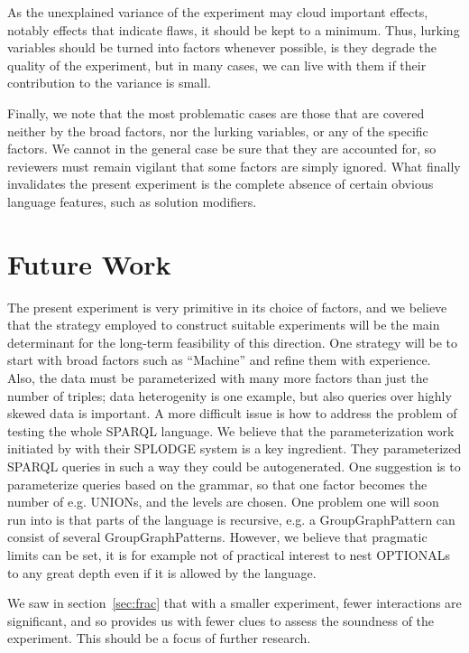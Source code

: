 \documentclass{llncs}
\begin{document}
As the unexplained variance of the experiment may cloud important
effects, notably effects that indicate flaws, it should be kept to a
minimum. Thus, lurking variables should be turned into factors
whenever possible, is they degrade the quality of the experiment, but
in many cases, we can live with them if their contribution to the
variance is small.

Finally, we note that the most problematic cases are those that are
covered neither by the broad factors, nor the lurking variables, or
any of the specific factors. We cannot in the general case be sure
that they are accounted for, so reviewers must remain vigilant that
some factors are simply ignored. What finally invalidates the present
experiment is the complete absence of certain obvious language
features, such as solution modifiers.

\section{Future Work}

The present experiment is very primitive in its choice of factors, and
we believe that the strategy employed to construct suitable
experiments will be the main determinant for the long-term feasibility
of this direction. One strategy will be to start with broad factors
such as ``Machine'' and refine them with experience. Also, the data
must be parameterized with many more factors than just the number of
triples; data heterogenity \cite{Duan:2011:AOC:1989323.1989340} is one
example, but also queries over highly skewed data is important. A more
difficult issue is how to address the problem of testing the whole
SPARQL language\cite{sparql11query}. We believe that the
parameterization work initiated by \cite{goerlitz2012splodge} with
their SPLODGE system is a key ingredient. They parameterized SPARQL
queries in such a way they could be autogenerated. One suggestion is
to parameterize queries based on the grammar, so that one factor
becomes the number of e.g. UNIONs, and the levels are chosen. One
problem one will soon run into is that parts of the language is
recursive, e.g. a GroupGraphPattern can consist of several
GroupGraphPatterns. However, we believe that pragmatic limits can be
set, it is for example not of practical interest to nest OPTIONALs to
any great depth even if it is allowed by the language.

We saw in section~\ref{sec:frac} that with a smaller experiment, fewer
interactions are significant, and so provides us with fewer clues to
assess the soundness of the experiment. This should be a focus of
further research. 
\end{document}
